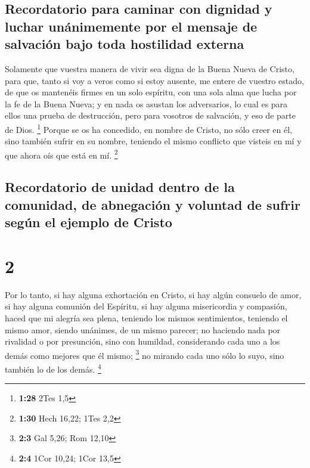 \hypertarget{recordatorio-para-caminar-con-dignidad-y-luchar-unuxe1nimemente-por-el-mensaje-de-salvaciuxf3n-bajo-toda-hostilidad-externa}{%
\subsection{Recordatorio para caminar con dignidad y luchar unánimemente
por el mensaje de salvación bajo toda hostilidad
externa}\label{recordatorio-para-caminar-con-dignidad-y-luchar-unuxe1nimemente-por-el-mensaje-de-salvaciuxf3n-bajo-toda-hostilidad-externa}}

 Solamente que vuestra manera de vivir sea digna de la
Buena Nueva de Cristo, para que, tanto si voy a veros como si estoy
ausente, me entere de vuestro estado, de que os mantenéis firmes en un
solo espíritu, con una sola alma que lucha por la fe de la Buena Nueva;
 y en nada os asustan los adversarios, lo cual es para
ellos una prueba de destrucción, pero para vosotros de salvación, y eso
de parte de Dios. \footnote{\textbf{1:28} 2Tes 1,5} 
Porque se os ha concedido, en nombre de Cristo, no sólo creer en él,
sino también sufrir en su nombre,  teniendo el mismo
conflicto que visteis en mí y que ahora oís que está en mí. \footnote{\textbf{1:30}
  Hech 16,22; 1Tes 2,2}

\hypertarget{recordatorio-de-unidad-dentro-de-la-comunidad-de-abnegaciuxf3n-y-voluntad-de-sufrir-seguxfan-el-ejemplo-de-cristo}{%
\subsection{Recordatorio de unidad dentro de la comunidad, de abnegación
y voluntad de sufrir según el ejemplo de
Cristo}\label{recordatorio-de-unidad-dentro-de-la-comunidad-de-abnegaciuxf3n-y-voluntad-de-sufrir-seguxfan-el-ejemplo-de-cristo}}

\hypertarget{section-1}{%
\section{2}\label{section-1}}

 Por lo tanto, si hay alguna exhortación en Cristo, si hay
algún consuelo de amor, si hay alguna comunión del Espíritu, si hay
alguna misericordia y compasión,  haced que mi alegría sea
plena, teniendo los mismos sentimientos, teniendo el mismo amor, siendo
unánimes, de un mismo parecer;  no haciendo nada por
rivalidad o por presunción, sino con humildad, considerando cada uno a
los demás como mejores que él mismo; \footnote{\textbf{2:3} Gal 5,26;
  Rom 12,10}  no mirando cada uno sólo lo suyo, sino
también lo de los demás. \footnote{\textbf{2:4} 1Cor 10,24; 1Cor 13,5}

